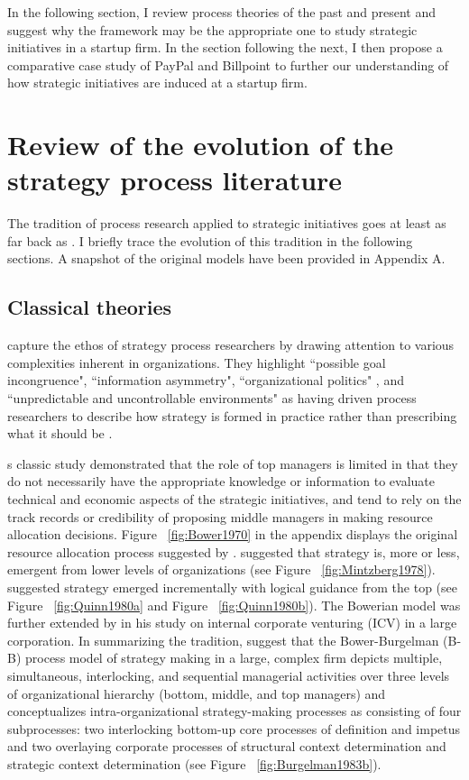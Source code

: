 \documentclass[12pt,letterpaper]{article}
\begin{document}
In the following section, I review process theories of the past and present and suggest why the \cite{Lovas2000} framework may be the appropriate one to study strategic initiatives in a startup firm. In the section following the next, I then propose a comparative case study of PayPal and Billpoint to further our understanding of how strategic initiatives are induced at a startup firm. 

\section{Review of the evolution of the strategy process literature}
The tradition of process research applied to strategic initiatives goes at least as far back as \cite{Bower1970}. I briefly trace the evolution of this tradition in the following sections. A snapshot of the original models have been provided in Appendix A.

\subsection{Classical theories}
\cite{Noda1996} capture the ethos of strategy process researchers by drawing attention to various complexities inherent in organizations. They highlight ``possible goal incongruence", ``information asymmetry", ``organizational politics" \citep{Barnard1938, Simon1997, Cyert1963}, and ``unpredictable and uncontrollable environments" \citep{Schumpeter1934, Nelson1982, Thompson1967, Pfeffer1978} as having driven process researchers to describe how strategy is formed in practice rather than prescribing what it should be \citep{Mintzberg2005}.\par
\cite{Bower1970}\textquotesingle s classic study demonstrated that the role of top managers is limited in that they do not necessarily have the appropriate knowledge or information to evaluate technical and economic aspects of the strategic initiatives, and tend to rely on the track records or credibility of proposing middle managers in making resource allocation decisions. Figure ~\ref{fig:Bower1970} in the appendix displays the original resource allocation process suggested by \cite{Bower1970}. \cite{Mintzberg1978} suggested that strategy is, more or less, emergent from lower levels of organizations  (see Figure ~\ref{fig:Mintzberg1978}). \cite{Quinn1980} suggested strategy emerged incrementally with logical guidance from the top  (see Figure ~\ref{fig:Quinn1980a} and Figure ~\ref{fig:Quinn1980b}). The Bowerian model was further extended by \cite{Burgelman1983b} in his study on internal corporate venturing (ICV) in a large corporation. In summarizing the tradition, \cite{Noda1996} suggest that the Bower-Burgelman (B-B) process model of strategy making in a large, complex firm depicts multiple, simultaneous, interlocking, and sequential managerial activities over three levels of organizational hierarchy (bottom, middle, and top managers) and conceptualizes intra-organizational strategy-making processes as consisting of four subprocesses: two interlocking bottom-up core processes of definition and impetus and two overlaying corporate processes of structural context determination and strategic context determination (see Figure  ~\ref{fig:Burgelman1983b}).
\end{document}
